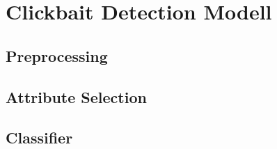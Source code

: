 \chapter{Clickbait Detection Modell} 
\label{cha:maschine_learning}

\section{Preprocessing} 
\label{sec:preprocessing}


\section{Attribute Selection} 
\label{sec:attribute_selection}


\section{Classifier} 
\label{sec:classifier}


